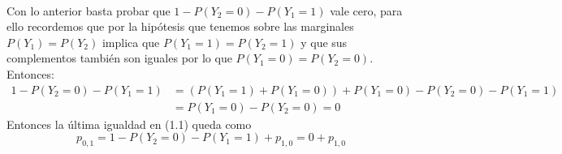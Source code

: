 \documentclass[paper=letter, fontsize=11pt]{scrartcl}
\numberwithin{equation}{section} %
\numberwithin{figure}{section} %
\numberwithin{table}{section} %
\begin{document}
\begin{enumerate}
\begin{equation}
\begin{split}
\end{split}
\end{equation}
Con lo anterior basta probar que $1-P(Y_2=0)-P(Y_1=1)$ vale cero, para ello recordemos que por la hipótesis que tenemos sobre las marginales $P(Y_1)=P(Y_2)$ implica que $P(Y_1=1)=P(Y_2=1)$ y que sus complementos también son iguales por lo que $P(Y_1=0)=P(Y_2=0)$.\\
Entonces:\\
\begin{equation*}
\begin{split}
1-P(Y_2=0)-P(Y_1=1) &= (P(Y_1 = 1)+P(Y_1=0)) + P(Y_1=0) -P(Y_2=0)-P(Y_1=1)\\
&= P(Y_1=0)-P(Y_2=0) = 0
\end{split}
\end{equation*}
Entonces la última igualdad en (1.1) queda como \[p_{0,1}= 1-P(Y_2=0)-P(Y_1=1) +p_{1,0} = 0+p_{1,0}\]




\end{enumerate}
\end{document}
